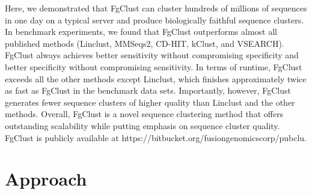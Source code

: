 \documentclass[11pt,letterpaper]{article}
\begin{document}
%

Here, we demonstrated that FgClust can cluster hundreds of millions of sequences in one day on a typical server and produce biologically faithful sequence clusters. In benchmark experiments, we found that FgClust outperforms almost all published methods (Linclust, MMSeqs2, CD-HIT, kClust, and VSEARCH). FgClust always achieves better sensitivity without compromising specificity and better specificity without compromising sensitivity. In terms of runtime, FgClust exceeds all the other methods except Linclust, which finishes approximately twice as fast as FgClust in the benchmark data sets. Importantly, however, FgClust generates fewer sequence clusters of higher quality than Linclust and the other methods. Overall, FgClust is a novel sequence clustering method that offers outstanding scalability while putting emphasis on sequence cluster quality. FgClust is publicly available at https://bitbucket.org/fusiongenomicscorp/pubclu.

\section{Approach}

\end{document}
